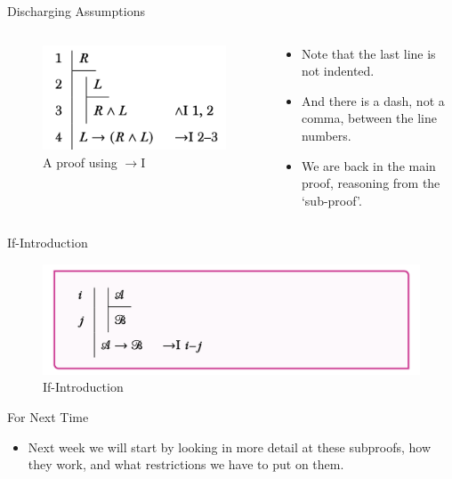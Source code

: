 \documentclass[
  ignorenonframetext,
]{beamer}
\providecommand{\tightlist}{%
  \setlength{\itemsep}{0pt}\setlength{\parskip}{0pt}}
\renewcommand{\,}{\text{, }}
\begin{document}
\begin{frame}{Discharging Assumptions}
\protect\hypertarget{discharging-assumptions}{}
\begin{columns}[c]
\begin{column}{0.48\textwidth}
\begin{figure}
\centering
\includegraphics{4_7c.png}
\caption{A proof using \(\rightarrow\)I}
\end{figure}
\end{column}

\begin{column}{0.48\textwidth}
\begin{itemize}
\tightlist
\item
  Note that the last line is not indented.
\item
  And there is a dash, not a comma, between the line numbers.
\item
  We are back in the main proof, reasoning from the `sub-proof'.
\end{itemize}
\end{column}
\end{columns}
\end{frame}

\begin{frame}{If-Introduction}
\protect\hypertarget{if-introduction-1}{}
\begin{figure}
\centering
\includegraphics{4_7d.png}
\caption{If-Introduction}
\end{figure}
\end{frame}

\begin{frame}{For Next Time}
\protect\hypertarget{for-next-time}{}
\begin{itemize}
\tightlist
\item
  Next week we will start by looking in more detail at these subproofs,
  how they work, and what restrictions we have to put on them.
\end{itemize}
\end{frame}
\end{document}
